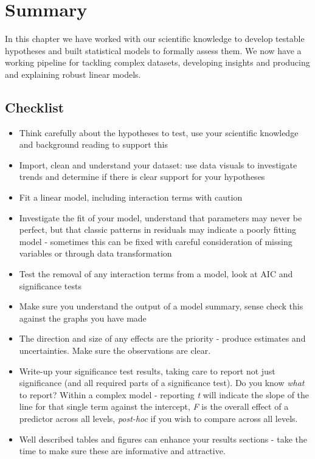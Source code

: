 \documentclass[
]{book}
\begin{document}
\hypertarget{summary-8}{%
\section{Summary}\label{summary-8}}

In this chapter we have worked with our scientific knowledge to develop testable hypotheses and built statistical models to formally assess them. We now have a working pipeline for tackling complex datasets, developing insights and producing and explaining robust linear models.

\hypertarget{checklist}{%
\subsection{Checklist}\label{checklist}}

\begin{itemize}
\item
  Think carefully about the hypotheses to test, use your scientific knowledge and background reading to support this
\item
  Import, clean and understand your dataset: use data visuals to investigate trends and determine if there is clear support for your hypotheses
\item
  Fit a linear model, including interaction terms with caution
\item
  Investigate the fit of your model, understand that parameters may never be perfect, but that classic patterns in residuals may indicate a poorly fitting model - sometimes this can be fixed with careful consideration of missing variables or through data transformation
\item
  Test the removal of any interaction terms from a model, look at AIC and significance tests
\item
  Make sure you understand the output of a model summary, sense check this against the graphs you have made
\item
  The direction and size of any effects are the priority - produce estimates and uncertainties. Make sure the observations are clear.
\item
  Write-up your significance test results, taking care to report not just significance (and all required parts of a significance test). Do you know \emph{what} to report? Within a complex model - reporting \emph{t} will indicate the slope of the line for that single term against the intercept, \emph{F} is the overall effect of a predictor across all levels, \emph{post-hoc} if you wish to compare across all levels.
\item
  Well described tables and figures can enhance your results sections - take the time to make sure these are informative and attractive.
\end{itemize}
\end{document}
